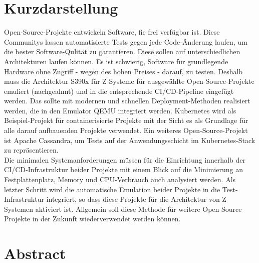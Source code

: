 \thispagestyle{empty}
\section*{Kurzdarstellung}
\label{sec:kurzdarstellung}
Open-Source-Projekte entwickeln Software, fie frei verfügbar ist. Diese Communitys lassen automatisierte Tests gegen jede Code-Änderung laufen, um die bester Software-Qulität zu garantieren. 
Diese sollen auf unterschiedlichen Architekturen laufen können. Es ist schwierig, Software für grundlegende Hardware ohne Zugriff - wegen des hohen Preises - darauf, zu testen. Deshalb muss die Architektur S390x für Z Systeme für ausgewählte Open-Source-Projekte emuliert (nachgeahmt) und in die entsprechende CI/CD-Pipeline eingefügt werden. Das sollte mit modernen und schnellen Deployment-Methoden realisiert werden, die in den Emulator QEMU integriert werden. Kubernetes wird als Beispiel-Projekt für containerisierte Projekte mit der Sicht es als Grundlage für alle darauf aufbauenden Projekte verwendet. Ein weiteres Open-Source-Projekt ist Apache Cassandra, um Tests auf der Anwendungsschicht im Kubernetes-Stack zu repräsentieren. \\
Die minimalen Systemanforderungen müssen für die Einrichtung innerhalb der CI/CD-Infrastruktur beider Projekte mit einem Blick auf die Minimierung an Festplattenplatz, Memory und CPU-Verbrauch auch analysiert werden. Als letzter Schritt wird die automatische Emulation beider Projekte in die Test-Infrastruktur integriert, so dass diese Projekte für die Architektur von Z Systemen aktiviert ist. Allgemein soll diese Methode für weitere Open Source Projekte in der Zukunft wiederverwendet werden können.



\section*{Abstract}
\label{sec:abstract}

